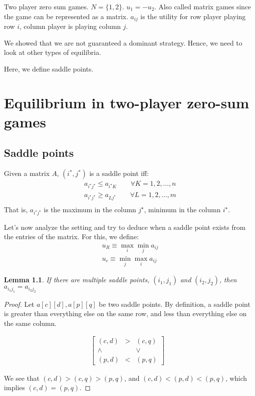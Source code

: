 \documentclass[11pt]{book}
\newtheorem{lemma}[corollary]{Lemma}
\newtheorem{proof}[corollary]{Proof}
\begin{document}
Two player zero sum games. $N = \{1, 2\}$. $u_1 = - u_2$. Also called
matrix games since the game can be represented as a matrix. $a_{ij}$ is
the utility for row player playing row $i$, column player is playing
column $j$.

We showed that we are not guaranteed a dominant strategy. Hence, we need
to look at other types of equilibria.

Here, we define saddle points. 

\chapter{Equilibrium in two-player zero-sum games}
\section{Saddle points}
Given a matrix $A$, $(i^*, j^*)$ is a saddle point iff:
\begin{align*}
    &a_{i^\star j^\star } \leq a_{i^\star K} \qquad \forall K = 1, 2, \dots, n \\
    &a_{i^\star j^\star } \geq a_{L j^\star } \qquad \forall L = 1, 2, \dots, m \\
\end{align*}
That is, $a_{i^\star j^\star }$ is the maximum in the column $j^\star$, minimum in the column
$i^\star $.


Let's now analyze the setting and try to deduce when a saddle point
exists from the entries of the matrix. For this, we define:
\begin{align*}
&u_R \equiv \max_i \min_j a_{ij} \\
&u_c \equiv \min_j \max_i a_{ij}
\end{align*}

\begin{lemma}
    If there are multiple saddle points, $(i_1, j_1)$ and $(i_2, j_2)$, then
    $a_{i_1 j_1} = a_{i_2 j_2}$
\end{lemma}
\begin{proof} 
    Let $a[c][d], a[p][q]$ be two saddle points. By definition, a saddle
    point is greater than everything else on the same row, and less than
    everything else on the same column.

    \begin{align*}
        \begin{bmatrix}
        (c, d)   & > & (c, q) \\
        \wedge & & \vee \\
        (p, d) & < & (p, q)
        \end{bmatrix}
    \end{align*}

    We see that $(c, d) > (c, q) > (p, q)$, and $(c, d) < (p, d) < (p, q)$,
    which implies $(c, d) = (p, q)$.
\end{proof}
\end{document}
